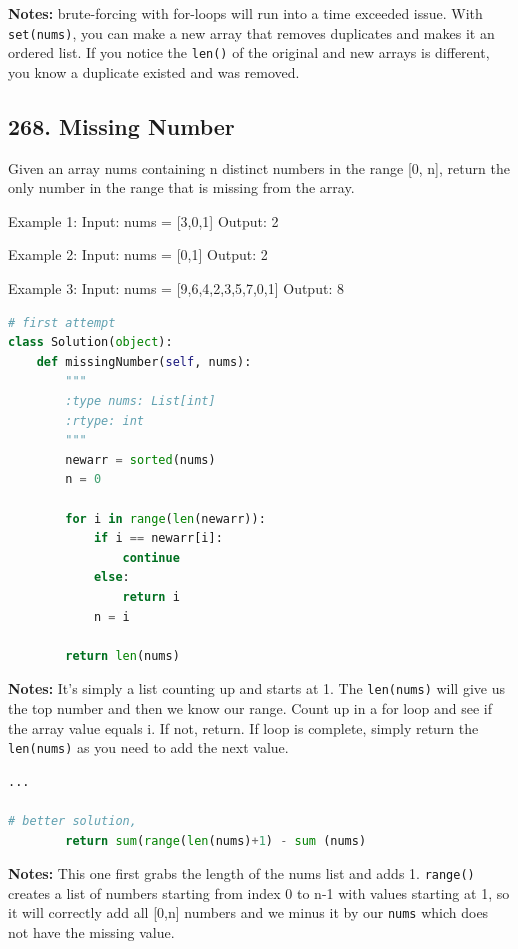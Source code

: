 \documentclass[11pt]{article}
\begin{document}
\noindent \textbf{Notes:} brute-forcing with for-loops will run into a time exceeded issue. With \texttt{set(nums)}, you can make a new array that removes duplicates and makes it an ordered list. If you notice the \texttt{len()} of the original and new arrays is different, you know a duplicate existed and was removed.

\subsection*{268. Missing Number}
Given an array nums containing n distinct numbers in the range [0, n], return the only number in the range that is missing from the array.

 

Example 1:
Input: nums = [3,0,1]
Output: 2

Example 2:
Input: nums = [0,1]
Output: 2

Example 3:
Input: nums = [9,6,4,2,3,5,7,0,1]
Output: 8

\begin{lstlisting}[language=python, mathescape=true]
# first attempt
class Solution(object):
    def missingNumber(self, nums):
        """
        :type nums: List[int]
        :rtype: int
        """
        newarr = sorted(nums)
        n = 0

        for i in range(len(newarr)):
            if i == newarr[i]:
                continue
            else:
                return i
            n = i

        return len(nums)
\end{lstlisting}

\noindent \textbf{Notes:} It's simply a list counting up and starts at 1. The \texttt{len(nums)} will give us the top number and then we know our range. Count up in a for loop and see if the array value equals i. If not, return. If loop is complete, simply return the \texttt{len(nums)} as you need to add the next value.


\begin{lstlisting}[language=python, mathescape=true]
...

# better solution, 
        return sum(range(len(nums)+1) - sum (nums)
\end{lstlisting}

\noindent \textbf{Notes:} This one first grabs the length of the nums list and adds 1. \texttt{range()} creates a list of numbers starting from index 0 to n-1 with values starting at 1, so it will correctly add all [0,n] numbers and we minus it by our \texttt{nums} which does not have the missing value.
\end{document}
